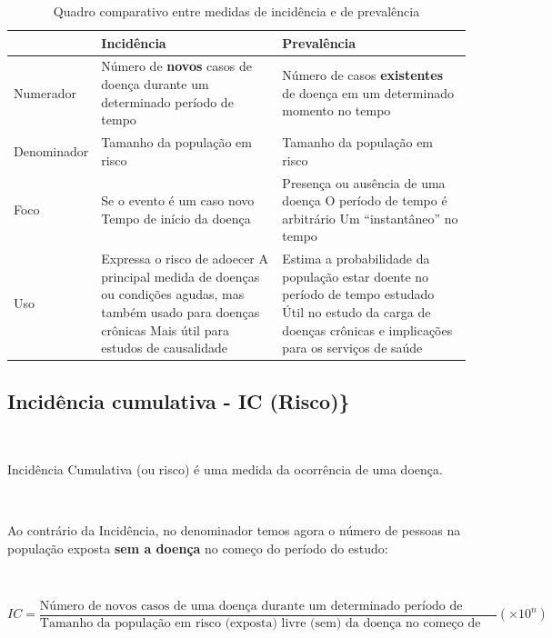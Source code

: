 \documentclass[
]{book}
\begin{document}
\begin{table}[h]
\centering
\caption{Quadro comparativo entre medidas de incidência e de prevalência}
\begin{tabular}{|p{3cm}|p{6cm}|p{6cm}|}
\hline
&  Incidência & Prevalência  \\
\hline
Numerador & Número de \textbf{novos} casos de doença durante um determinado período de tempo & Número de casos \textbf{existentes} de doença em um determinado momento no tempo\\
\hline
Denominador & Tamanho da população em risco & Tamanho da população em risco  \\
\hline
Foco & Se o evento é um caso novo \newline Tempo de início da doença  & Presença ou ausência de uma doença \newline  O período de tempo é arbitrário \newline Um ``instantâneo'' no tempo \\
\hline
Uso  & Expressa o risco de adoecer \newline A principal medida de doenças ou condições agudas, mas também usado para doenças crônicas \newline Mais útil para estudos de causalidade  & Estima a probabilidade da população estar doente no período de tempo estudado \newline Útil no estudo da carga de doenças crônicas e implicações para os serviços de saúde\\
\hline 
\end{tabular}
\label{tab1}
\end{table} 

\hfill\break

\hypertarget{inciduxeancia-cumulativa---ic-risco}{%
\subsection{Incidência cumulativa - IC (Risco)\}}\label{inciduxeancia-cumulativa---ic-risco}}

~

Incidência Cumulativa (ou risco) é uma medida da ocorrência de uma doença.

~

Ao contrário da Incidência, no denominador temos agora o número de pessoas na população exposta \textbf{sem a doença} no começo do período do estudo:

~

\[
IC=\frac{\text{Número de novos casos de uma doença durante um determinado período de tempo}}{\text{Tamanho da população em risco (exposta) livre (sem) da doença no começo de um determinado período de tempo}} (\times 10^{n}) 
\]
\end{document}
